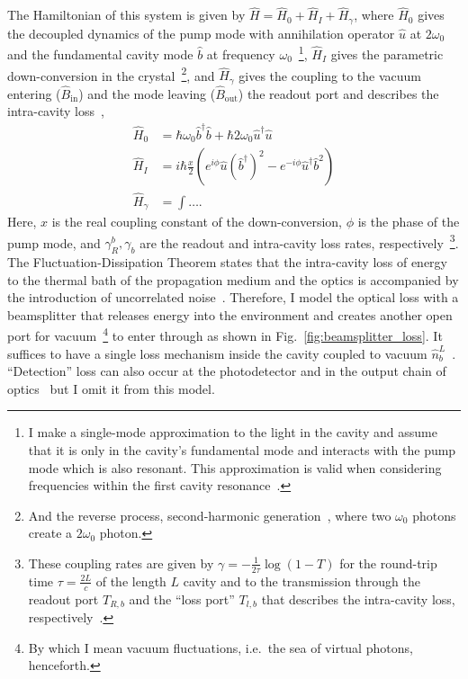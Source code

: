 The Hamiltonian of this system is given by $\hat H = \hat H_0 + \hat H_I + \hat H_\gamma$, where $\hat H_0$ gives the decoupled dynamics of the pump mode with annihilation operator $\hat u$ at $2\omega_0$ and the fundamental cavity mode $\hat b$ at frequency $\omega_0$~\footnote{I make a single-mode approximation to the light in the cavity and assume that it is only in the cavity's fundamental mode and interacts with the pump mode which is also resonant. This approximation is valid when considering frequencies within the first cavity resonance~\cite{}.}, $\hat H_I$ gives the parametric down-conversion in the crystal~\footnote{And the reverse process, second-harmonic generation~\cite{}, where two $\omega_0$ photons create a $2\omega_0$ photon.}, and $\hat H_\gamma$ gives the coupling to the vacuum entering ($\hat B_\text{in}$) and the mode leaving ($\hat B_\text{out}$) the readout port and describes the intra-cavity loss~\cite{},
\begin{align}
\hat H_0 &= \hbar \omega_0 \hat b^\dag \hat b + \hbar 2 \omega_0 \hat u^\dag \hat u\\
\hat H_I &= i \hbar \frac{x}{2} (e^{i\phi} \hat u (\hat b^\dag)^2 - e^{-i\phi} \hat u^\dag \hat b^2)\\
\hat H_\gamma &= \int \ldots .
\end{align}
Here, $x$ is the real coupling constant of the down-conversion, $\phi$ is the phase of the pump mode, and $\gamma^b_R,\gamma_b$ are the readout and intra-cavity loss rates, respectively~\footnote{These coupling rates are given by $\gamma = -\frac{1}{2\tau}\log(1-T)$ for the round-trip time $\tau = \frac{2L}{c}$ of the length $L$ cavity and to the transmission through the readout port $T_{R,b}$ and the ``loss port'' $T_{l,b}$ that describes the intra-cavity loss, respectively~\cite{}.}. %
The Fluctuation-Dissipation Theorem states that the intra-cavity loss of energy to the thermal bath of the propagation medium and the optics is accompanied by the introduction of uncorrelated noise~\cite{}. Therefore, I model the optical loss with a beamsplitter that releases energy into the environment and creates another open port for vacuum~\footnote{By which I mean vacuum fluctuations, i.e.\ the sea of virtual photons, henceforth.} to enter through as shown in Fig.~\ref{fig:beamsplitter_loss}. It suffices to have a single loss mechanism inside the cavity coupled to vacuum $\hat n^L_b$~\cite{}. ``Detection'' loss can also occur at the photodetector and in the output chain of optics~\cite{} but I omit it from this model.

